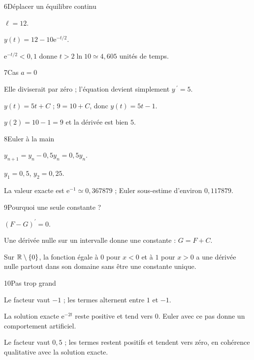 \begin{corrige}{6}{Déplacer un équilibre continu}
\begin{questions}
\item $\ell=12$.
\item $y(t)=12-10\mathrm e^{-t/2}$.
\item $\mathrm e^{-t/2}<0{,}1$ donne $t>2\ln10\simeq4{,}605$ unités de temps.
\end{questions}
\end{corrige}
\begin{corrige}{7}{Cas $a=0$}
\begin{questions}
\item Elle diviserait par zéro ; l’équation devient simplement $y\,\!^{\prime}=5$.
\item $y(t)=5t+C$ ; $9=10+C$, donc $y(t)=5t-1$.
\item $y(2)=10-1=9$ et la dérivée est bien $5$.
\end{questions}
\end{corrige}
\begin{corrige}{8}{Euler à la main}
\begin{questions}
\item $y_{n+1}=y_n-0{,}5y_n=0{,}5y_n$.
\item $y_1=0{,}5$, $y_2=0{,}25$.
\item La valeur exacte est $\mathrm e^{-1}\simeq0{,}367879$ ; Euler sous-estime d’environ $0{,}117879$.
\end{questions}
\end{corrige}
\begin{corrige}{9}{Pourquoi une seule constante ?}
\begin{questions}
\item $(F-G)^{\prime}=0$.
\item Une dérivée nulle sur un intervalle donne une constante : $G=F+C$.
\item Sur $\mathbb{R}\setminus\{0\}$, la fonction égale à $0$ pour $x<0$ et à $1$ pour $x>0$ a une dérivée nulle partout dans son domaine sans être une constante unique.
\end{questions}
\end{corrige}
\begin{corrige}{10}{Pas trop grand}
\begin{questions}
\item Le facteur vaut $-1$ ; les termes alternent entre $1$ et $-1$.
\item La solution exacte $\mathrm e^{-2t}$ reste positive et tend vers $0$. Euler avec ce pas donne un comportement artificiel.
\item Le facteur vaut $0{,}5$ ; les termes restent positifs et tendent vers zéro, en cohérence qualitative avec la solution exacte.
\end{questions}
\end{corrige}
